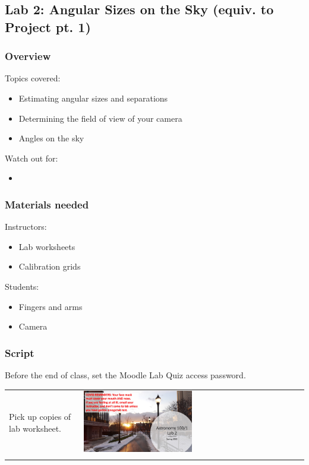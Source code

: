 \documentclass[12pt]{article}
\begin{document}
\newpage
\subsection{Lab 2: Angular Sizes on the Sky (equiv. to Project pt. 1)}

\subsubsection{Overview}

Topics covered:
\begin{itemize}
\item Estimating angular sizes and separations
\item Determining the field of view of your camera
\item Angles on the sky
\end{itemize}

\noindent
Watch out for:
\begin{itemize}
\item 
\end{itemize}


\subsubsection{Materials needed}

Instructors:
\begin{itemize}
\item Lab worksheets
\item Calibration grids
\end{itemize}

\noindent
Students:
\begin{itemize}
\item Fingers and arms
\item Camera
\end{itemize}


\subsubsection{Script}

Before the end of class, set the Moodle Lab Quiz access password.

\begin{longtable}{m{}m{}}
Pick up copies of lab worksheet. & \includegraphics[width=0.5\textwidth]{ppt/lab02/Slide1.jpeg}\\

\label{default}
\end{longtable}
\end{document}
